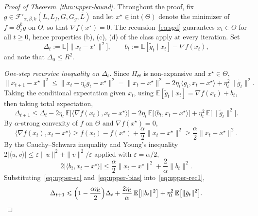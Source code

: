 \documentclass[10pt,a4paper]{amsart}
\renewcommand{\geq}{\geqslant}
\renewcommand{\leq}{\leqslant}
\begin{document}
\begin{proof}[Proof of Theorem~\ref{thm:upper-bound}]
\label{proof:thm1}
Throughout the proof, fix 
$g\in\mathcal{F}'_{\alpha,\beta,k}(L,L_f,G,G_g,\bar{L})$ and 
let $x^\star\in\mathrm{int}(\Theta)$ denote the minimizer of 
$f=\partial_j^k g$ on $\Theta$, so that $\nabla f(x^\star)=0$. The 
recursion~\eqref{eq:sgd} guarantees $x_t\in\Theta$ for all 
$t\geq 0$, hence properties (b), (c), (d) of the class apply at 
every iteration. Set
\[
\Delta_t:=\mathbb{E}\bigl[\|x_t-x^\star\|^2\bigr],
\qquad 
b_t:=\mathbb{E}[\tilde{g}_t\mid x_t]-\nabla f(x_t),
\]
and note that $\Delta_0\leq R^2$.

\medskip
\noindent\textit{One-step recursive inequality on $\Delta_t$.}
Since $\Pi_\Theta$ is non-expansive and $x^\star\in\Theta$,
\[
\|x_{t+1}-x^\star\|^2
\leq\|x_t-\eta_t\tilde{g}_t-x^\star\|^2
=\|x_t-x^\star\|^2-2\eta_t\langle\tilde{g}_t,x_t-x^\star\rangle
+\eta_t^2\|\tilde{g}_t\|^2.
\]
Taking the conditional expectation given $x_t$, using 
$\mathbb{E}[\tilde{g}_t\mid x_t]=\nabla f(x_t)+b_t$, then taking 
total expectation,
\begin{equation}
\label{eq:upper-rec1}
\Delta_{t+1}\leq\Delta_t
-2\eta_t\,\mathbb{E}\bigl[\langle\nabla f(x_t),x_t-x^\star\rangle\bigr]
-2\eta_t\,\mathbb{E}\bigl[\langle b_t,x_t-x^\star\rangle\bigr]
+\eta_t^2\,\mathbb{E}\bigl[\|\tilde{g}_t\|^2\bigr].
\end{equation}
By $\alpha$-strong convexity of $f$ on $\Theta$ and 
$\nabla f(x^\star)=0$,
\begin{equation}
\label{eq:upper-sc}
\langle\nabla f(x_t),x_t-x^\star\rangle
\geq f(x_t)-f(x^\star)+\frac{\alpha}{2}\|x_t-x^\star\|^2
\geq\frac{\alpha}{2}\|x_t-x^\star\|^2.
\end{equation}
By the Cauchy--Schwarz inequality and Young's inequality 
$2|\langle u,v\rangle|\leq\varepsilon\|u\|^2+\|v\|^2/\varepsilon$ 
applied with $\varepsilon=\alpha/2$,
\begin{equation}
\label{eq:upper-bias}
2\bigl|\langle b_t,x_t-x^\star\rangle\bigr|
\leq\frac{\alpha}{2}\|x_t-x^\star\|^2+\frac{2}{\alpha}\|b_t\|^2.
\end{equation}
Substituting~\eqref{eq:upper-sc} and~\eqref{eq:upper-bias} 
into~\eqref{eq:upper-rec1},
\begin{equation}
\label{eq:upper-rec2}
\Delta_{t+1}\leq\Bigl(1-\frac{\alpha\eta_t}{2}\Bigr)\Delta_t
+\frac{2\eta_t}{\alpha}\,\mathbb{E}\bigl[\|b_t\|^2\bigr]
+\eta_t^2\,\mathbb{E}\bigl[\|\tilde{g}_t\|^2\bigr].
\end{equation}


\end{proof}
\end{document}
